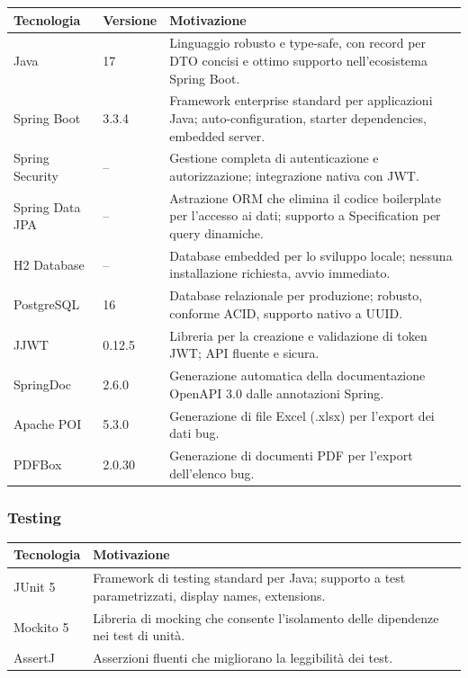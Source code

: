 ﻿\documentclass[a4paper,11pt]{article}
\begin{document}
\begin{tabular}{|l|l|p{8cm}|}
\hline
\textbf{Tecnologia} & \textbf{Versione} & \textbf{Motivazione} \\
\hline
Java & 17 & Linguaggio robusto e type-safe, con record per DTO concisi e ottimo supporto nell'ecosistema Spring Boot. \\
\hline
Spring Boot & 3.3.4 & Framework enterprise standard per applicazioni Java; auto-configuration, starter dependencies, embedded server. \\
\hline
Spring Security & -- & Gestione completa di autenticazione e autorizzazione; integrazione nativa con JWT. \\
\hline
Spring Data JPA & -- & Astrazione ORM che elimina il codice boilerplate per l'accesso ai dati; supporto a Specification per query dinamiche. \\
\hline
H2 Database & -- & Database embedded per lo sviluppo locale; nessuna installazione richiesta, avvio immediato. \\
\hline
PostgreSQL & 16 & Database relazionale per produzione; robusto, conforme ACID, supporto nativo a UUID. \\
\hline
JJWT & 0.12.5 & Libreria per la creazione e validazione di token JWT; API fluente e sicura. \\
\hline
SpringDoc & 2.6.0 & Generazione automatica della documentazione OpenAPI 3.0 dalle annotazioni Spring. \\
\hline
Apache POI & 5.3.0 & Generazione di file Excel (.xlsx) per l'export dei dati bug. \\
\hline
PDFBox & 2.0.30 & Generazione di documenti PDF per l'export dell'elenco bug. \\
\hline
\end{tabular}

\subsubsection{Testing}

\begin{tabular}{|l|p{10cm}|}
\hline
\textbf{Tecnologia} & \textbf{Motivazione} \\
\hline
JUnit 5 & Framework di testing standard per Java; supporto a test parametrizzati, display names, extensions. \\
\hline
Mockito 5 & Libreria di mocking che consente l'isolamento delle dipendenze nei test di unit\`a. \\
\hline
AssertJ & Asserzioni fluenti che migliorano la leggibilit\`a dei test. \\
\hline
\end{tabular}
\end{document}

